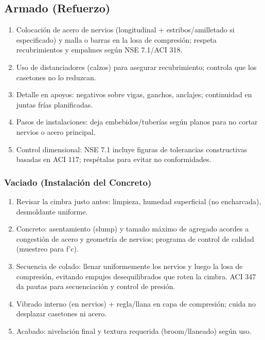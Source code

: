 \documentclass[12pt,a4paper]{article}
\begin{document}
	\subsection{ Armado (Refuerzo)}
	\begin{enumerate}
		\item Colocación de acero de nervios (longitudinal + estribos/amilletado si especificado) y malla o barras en la losa de compresión; respeta recubrimientos y empalmes según NSE 7.1/ACI 318.
		\item Uso de distanciadores (calzos) para asegurar recubrimiento; controla que los casetones no lo reduzcan.
		\item Detalle en apoyos: negativos sobre vigas, ganchos, anclajes; continuidad en juntas frías planificadas.
		\item Pasos de instalaciones: deja embebidos/tuberías según planos para no cortar nervios o acero principal.
		\item Control dimensional: NSE 7.1 incluye figuras de tolerancias constructivas basadas en ACI 117; respétalas para evitar no conformidades.
	\end{enumerate}
	
	\subsubsection{Vaciado (Instalación del Concreto)}
	\begin{enumerate}
		\item Revisar la cimbra justo antes: limpieza, humedad superficial (no encharcada), desmoldante uniforme.
		\item Concreto: asentamiento (slump) y tamaño máximo de agregado acordes a congestión de acero y geometría de nervios; programa de control de calidad (muestreo para f’c).
		\item Secuencia de colado: llenar uniformemente los nervios y luego la losa de compresión, evitando empujes desequilibrados que roten la cimbra. ACI 347 da pautas para secuenciación y control de presión.
		\item Vibrado interno (en nervios) + regla/llana en capa de compresión; cuida no desplazar casetones ni acero.
		\item Acabado: nivelación final y textura requerida (broom/llaneado) según uso.
	\end{enumerate}
	
\end{document}
